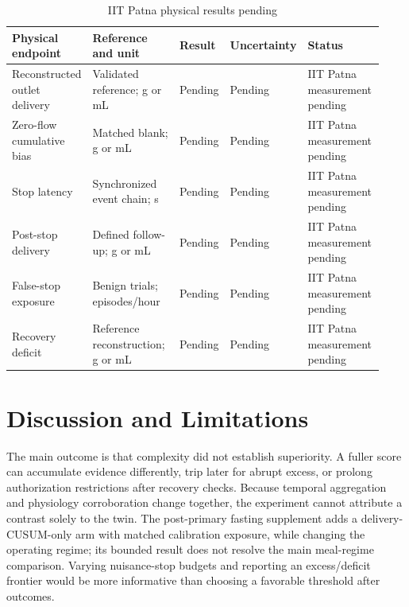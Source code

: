\documentclass[journal,10pt,letterpaper]{IEEEtran}
\begin{document}
\begin{table}[!t]
\centering
\caption{IIT Patna physical results pending}
\label{tab:4}
\small
\setlength{\tabcolsep}{3pt}
\renewcommand{\arraystretch}{1.17}
\begin{tabularx}{\linewidth}{>{\raggedright\arraybackslash}p{0.21\linewidth}>{\raggedright\arraybackslash}p{0.27\linewidth}>{\raggedright\arraybackslash}p{0.11\linewidth}>{\raggedright\arraybackslash}p{0.12\linewidth}>{\raggedright\arraybackslash}p{0.22\linewidth}}
\toprule
\textbf{Physical endpoint} & \textbf{Reference and unit} & \textbf{Result} & \textbf{Uncertainty} & \textbf{Status} \\
\midrule
\rowcolor{pendingbg}
Reconstructed outlet delivery & Validated reference; g or mL & Pending & Pending & IIT Patna measurement pending \\
\rowcolor{pendingbg}
Zero-flow cumulative bias & Matched blank; g or mL & Pending & Pending & IIT Patna measurement pending \\
\rowcolor{pendingbg}
Stop latency & Synchronized event chain; s & Pending & Pending & IIT Patna measurement pending \\
\rowcolor{pendingbg}
Post-stop delivery & Defined follow-up; g or mL & Pending & Pending & IIT Patna measurement pending \\
\rowcolor{pendingbg}
False-stop exposure & Benign trials; episodes/hour & Pending & Pending & IIT Patna measurement pending \\
\rowcolor{pendingbg}
Recovery deficit & Reference reconstruction; g or mL & Pending & Pending & IIT Patna measurement pending \\
\bottomrule
\end{tabularx}
\end{table}

\section{Discussion and Limitations}

The main outcome is that complexity did not establish superiority. A
fuller score can accumulate evidence differently, trip later for abrupt
excess, or prolong authorization restrictions after recovery checks.
Because temporal aggregation and physiology corroboration change
together, the experiment cannot attribute a contrast solely to the twin.
The post-primary fasting supplement adds a delivery-CUSUM-only arm with
matched calibration exposure, while changing the operating regime; its
bounded result does not resolve the main meal-regime comparison. Varying
nuisance-stop budgets and reporting an excess/deficit frontier would be
more informative than choosing a favorable threshold after outcomes.
\end{document}

